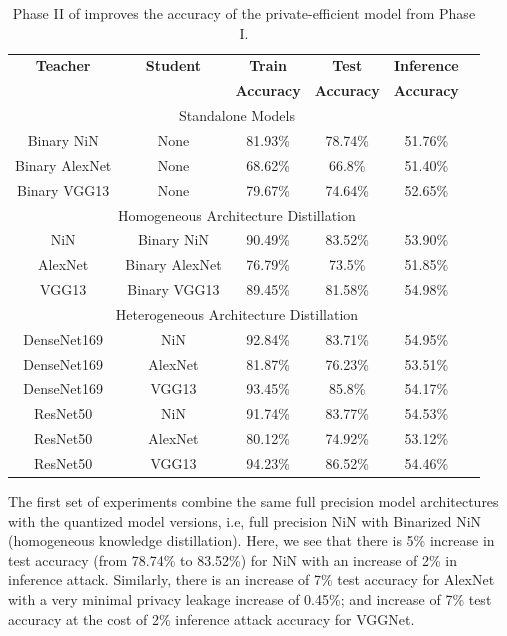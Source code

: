 \begin{table}[!htb]
\begin{center}
\renewcommand\arraystretch{1.5}
\fontsize{6.7pt}{6.7pt}\selectfont
\begin{tabular}{|c|c|c|c|c|c|}
\hline
\textbf{Teacher} & \textbf{Student} & \textbf{Train}  & \textbf{Test}  & \textbf{Inference}  \\
&  & \textbf{Accuracy} & \textbf{Accuracy} & \textbf{Accuracy}  \\
\hline
\multicolumn{5}{|c|}{Standalone Models}\\
\hline
Binary NiN & None & 81.93\% & 78.74\% & 51.76\% \\
Binary AlexNet & None & 68.62\% & 66.8\% & 51.40\% \\
Binary VGG13 & None & 79.67\% & 74.64\% & 52.65\%\\
\hline
\multicolumn{5}{|c|}{Homogeneous Architecture Distillation}\\
\hline
NiN & Binary NiN & 90.49\% & 83.52\% & 53.90\% \\
AlexNet & Binary AlexNet & 76.79\% & 73.5\% & 51.85\% \\
VGG13 & Binary VGG13 & 89.45\% & 81.58\% & 54.98\%\\
\hline
\multicolumn{5}{|c|}{Heterogeneous Architecture Distillation}\\
\hline
DenseNet169 & NiN & 92.84\% & 83.71\% & 54.95\%\\
DenseNet169 & AlexNet & 81.87\% & 76.23\% & 53.51\%\\
DenseNet169 & VGG13 & 93.45\% & 85.8\% & 54.17\%\\
\hline
ResNet50 & NiN & 91.74\% & 83.77\% & 54.53\% \\
ResNet50 & AlexNet & 80.12\% & 74.92\% & 53.12\%\\
ResNet50 & VGG13 & 94.23\% & 86.52\% & 54.46\%\\
\hline
\end{tabular}
\end{center}
\caption{Phase II of \method\hspace{0.02in} improves the accuracy of the private-efficient model from Phase I.}
\label{kd}
\end{table}


The first set of experiments combine the same full precision model architectures with the quantized model versions, i.e, full precision NiN with Binarized NiN (homogeneous knowledge distillation).
Here, we see that there is 5\% increase in test accuracy (from 78.74\% to 83.52\%) for NiN with an increase of 2\% in inference attack.
Similarly, there is an increase of 7\% test accuracy for AlexNet with a very minimal privacy leakage increase of 0.45\%; and increase of 7\% test accuracy at the cost of 2\% inference attack accuracy for VGGNet.

